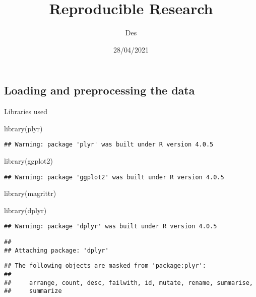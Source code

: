 \documentclass[
]{article}
\title{Reproducible Research}
\author{Des}
\date{28/04/2021}
\newenvironment{Shaded}{\begin{snugshade}}{\end{snugshade}}
\newcommand{\FunctionTok}[1]{\textcolor[rgb]{0.00,0.00,0.00}{#1}}
\newcommand{\NormalTok}[1]{#1}
\begin{document}
\maketitle

\hypertarget{loading-and-preprocessing-the-data}{%
\subsection{Loading and preprocessing the
data}\label{loading-and-preprocessing-the-data}}

Libraries used

\begin{Shaded}
\begin{Highlighting}[]
\FunctionTok{library}\NormalTok{(plyr)}
\end{Highlighting}
\end{Shaded}

\begin{verbatim}
## Warning: package 'plyr' was built under R version 4.0.5
\end{verbatim}

\begin{Shaded}
\begin{Highlighting}[]
\FunctionTok{library}\NormalTok{(ggplot2)}
\end{Highlighting}
\end{Shaded}

\begin{verbatim}
## Warning: package 'ggplot2' was built under R version 4.0.5
\end{verbatim}

\begin{Shaded}
\begin{Highlighting}[]
\FunctionTok{library}\NormalTok{(magrittr)}

\FunctionTok{library}\NormalTok{(dplyr)}
\end{Highlighting}
\end{Shaded}

\begin{verbatim}
## Warning: package 'dplyr' was built under R version 4.0.5
\end{verbatim}

\begin{verbatim}
## 
## Attaching package: 'dplyr'
\end{verbatim}

\begin{verbatim}
## The following objects are masked from 'package:plyr':
## 
##     arrange, count, desc, failwith, id, mutate, rename, summarise,
##     summarize
\end{verbatim}
\end{document}
